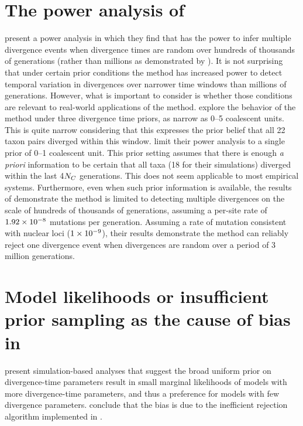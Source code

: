 \documentclass[letterpaper,12pt]{article}
\begin{document}
\begin{linenumbers}
\section*{The power analysis of \citet{Hickerson2013}}
\citet{Hickerson2013} present a power analysis in which they find that
\msb has the power to infer multiple divergence events when divergence times
are random over hundreds of thousands of generations (rather than millions as
demonstrated by \citet{Oaks2012}).
It is not surprising that under certain prior conditions the method has
increased power to detect temporal variation in divergences over narrower time
windows than millions of generations.
However, what is important to consider is whether those conditions are relevant
to real-world applications of the method.
\citet{Oaks2012} explore the behavior of the method under three divergence time
priors, as narrow as 0--5 coalescent units.
This is quite narrow considering that this expresses the prior belief that all
22 taxon pairs diverged within this window.
\citet{Hickerson2013} limit their power analysis to a single prior of 0--1
coalescent unit.
This prior setting assumes that there is enough \emph{a priori} information to
be certain that all taxa (18 for their simulations) diverged within
the last 4$N_C$ generations.
This does not seem applicable to most empirical systems.
Furthermore, even when such prior information is available, the results of
\citet{Hickerson2013} demonstrate the method is limited to detecting multiple
divergences on the scale of hundreds of thousands of generations, assuming a
per-site rate of $1.92\times 10^{-8}$ mutations per generation.
Assuming a rate of mutation consistent with nuclear loci ($1\times 10^{-9}$), their
results demonstrate the method can reliably reject one divergence event when
divergences are random over a period of 3 million generations.





\section*{Model likelihoods or insufficient prior sampling as the cause of bias
in \msb}
\citet{Oaks2012} present simulation-based analyses that suggest the broad
uniform prior on divergence-time parameters result in small marginal
likelihoods of models with more divergence-time parameters, and thus a
preference for models with few divergence parameters.
\citet{Hickerson2013} conclude that the bias is due to the inefficient
rejection algorithm implemented in \msb.


\end{linenumbers}
\end{document}
